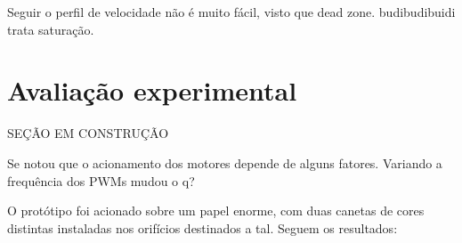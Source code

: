 
Seguir o perfil de velocidade não é muito fácil, visto que dead zone. budibudibuidi \cite{indiveri2009swedish} trata saturação.

\section{Avaliação experimental}
\label{sec:experimental}

SEÇÃO EM CONSTRUÇÃO

Se notou que o acionamento dos motores depende de alguns fatores. Variando a frequência dos PWMs mudou o q?

O protótipo foi acionado sobre um papel enorme, com duas canetas de cores distintas instaladas nos orifícios destinados a tal. Seguem os resultados:
